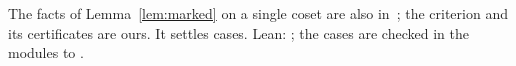 \begin{remark}
The facts of Lemma~\ref{lem:marked} on a single coset are also in~\cite[Lemma~4.1]{he-wu}; the
criterion and its certificates are ours. It settles  cases. Lean:
; the cases are checked in the modules
 to .
\end{remark}
